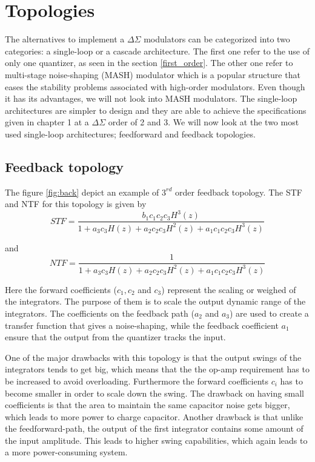 \section{Topologies}
The alternatives to implement a $\Delta\Sigma$ modulators can be categorized into two categories: a single-loop or a cascade architecture. The first one refer to the use of only one quantizer, as seen in the section \ref{first_order}. The other one refer to multi-stage noise-shaping (MASH) modulator which is a popular structure that eases the stability problems associated with high-order modulators. Even though it has its advantages, we will not look into MASH modulators. The single-loop architectures are simpler to design and they are able to achieve the specifications given in chapter 1 at a $\Delta\Sigma$ order of 2 and 3. We will now look at the two most used single-loop architectures; feedforward and feedback topologies. 

\subsection{Feedback topology}
The figure \ref{fig:back} depict an example of $3^{rd}$ order feedback topology. The STF and NTF for this topology is given by
\begin{equation}
    STF = \frac{b_1c_1c_2c_3H^3(z)}{1 + a_3c_3H(z) + a_2c_2c_3H^2(z) + a_1c_1c_2c_3H^3(z)}
\end{equation}

and
\begin{equation}
    NTF = \frac{1}{1 + a_3c_3H(z) + a_2c_2c_3H^2(z) + a_1c_1c_2c_3H^3(z)}
\end{equation}

Here the forward coefficients ($c_1, c_2$ and $c_3$) represent the scaling or weighed of the integrators. The purpose of them is to scale the output dynamic range of the integrators. The coefficients on the feedback path ($a_2$ and $a_3$) are used to create a transfer function that gives a noise-shaping, while the feedback coefficient $a_1$ ensure that the output from the quantizer tracks the input.

One of the major drawbacks with this topology is that the output swings of the integrators tends to get big, which means that the the op-amp requirement has to be increased to avoid overloading. Furthermore the forward coefficients $c_i$ has to become smaller in order to scale down the swing. The drawback on having small coefficients is that the area to maintain the same capacitor noise gets bigger, which leads to more power to charge capacitor. Another drawback is that unlike the feedforward-path, the output of the first integrator contains some amount of the input amplitude. This leads to higher swing capabilities, which again leads to a more power-consuming system.   

